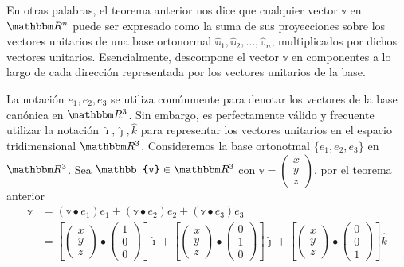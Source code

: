 \begin{observation}
    En otras palabras, el teorema anterior nos dice que cualquier vector $\mathbb{v}$ en $\RR[n]$ puede ser expresado como la suma de sus proyecciones sobre los vectores unitarios de una base ortonormal $\hat{\mathbb{u}}_1, \hat{\mathbb{u}}_2, \dots, \hat{\mathbb{u}}_n$, multiplicados por dichos vectores unitarios. Esencialmente, descompone el vector $\mathbb{v}$ en componentes a lo largo de cada dirección representada por los vectores unitarios de la base.
\end{observation}

\newpage

\begin{example}
    La notación \( e_1, e_2, e_3 \) se utiliza comúnmente para denotar los vectores de la base canónica en \( \RR[3] \). Sin embargo, es perfectamente válido y frecuente utilizar la notación \( \hat{\imath}, \hat{\jmath}, \hat{k} \) para representar los vectores unitarios en el espacio tridimensional \( \RR[3] \). Consideremos la base ortonotmal $\{ e_1, e_2, e_3 \}$ en $\RR[3]$. Sea $\mathbb{v} \in \RR[3]$ con $\mathbb{v} = \begin{pmatrix} x \\ y \\ z \end{pmatrix}$, por el teorema anterior
    \begin{align*}
        \mathbb{v} & = (\mathbb{v} \bullet e_1)e_1 + (\mathbb{v} \bullet e_2)e_2 + (\mathbb{v} \bullet e_3)e_3 \\
        & = \left[ \begin{pmatrix} x \\ y \\ z \end{pmatrix} \bullet \begin{pmatrix} 1 \\ 0 \\ 0 \end{pmatrix} \right] \hat{\imath} + \left[ \begin{pmatrix} x \\ y \\ z \end{pmatrix} \bullet \begin{pmatrix} 0 \\ 1 \\ 0 \end{pmatrix} \right] \hat{\jmath} + \left[ \begin{pmatrix} x \\ y \\ z \end{pmatrix} \bullet \begin{pmatrix} 0 \\ 0 \\ 1 \end{pmatrix} \right] \hat{k} \\

\end{align*}
\end{example}

